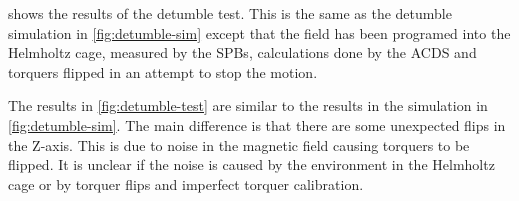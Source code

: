 shows the results of the detumble test. This is the same as the detumble simulation in \cref{fig:detumble-sim} except that the field has been programed into the Helmholtz cage, measured by the \acp{SPB}, calculations done by the \ac{ACDS} and torquers flipped in an attempt to stop the motion.

The results in \cref{fig:detumble-test} are similar to the results in the simulation in \cref{fig:detumble-sim}. The main difference is that there are some unexpected flips in the Z-axis. This is due to noise in the magnetic field causing torquers to be flipped. It is unclear if the noise is caused by the environment in the Helmholtz cage or by torquer flips and imperfect torquer calibration.


